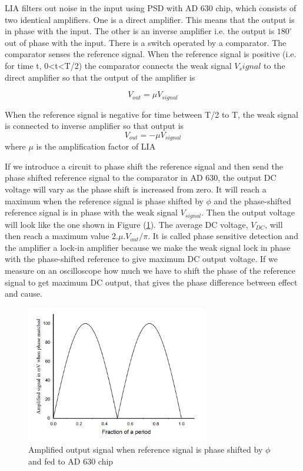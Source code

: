 \documentclass[a4paper, amsfonts, amssymb, amsmath, reprint, showkeys, nofootinbib, twoside]{revtex4-1}
\begin{document}
LIA filters out noise in the input using PSD with AD 630 chip, which consists of  two identical amplifiers. 
One is a direct amplifier. This means that the
output is in phase with the input. The other is an inverse amplifier i.e. the output is $180^{\circ}$
out of phase with the input. There is a switch operated by a comparator. The comparator senses the reference signal. When the reference signal is positive (i.e. for time t, 0<t<T/2) the comparator connects the weak signal $V_signal$ to the direct amplifier so that the output of the amplifier is 

\begin{equation}
	V_{out}=\mu V_{signal}
\end{equation}

When the reference signal is negative for time between T/2 to T, the weak signal is connected to inverse amplifier so that output is 
\begin{equation}
	V_{out}=-\mu V_{signal}
\end{equation}
where $\mu$ is the amplification factor of LIA

If we introduce a circuit to phase shift the reference signal and then send the phase shifted
reference signal to the comparator in AD 630, the output DC voltage will vary as the phase shift is increased from zero. It will reach a maximum when the reference signal is phase shifted by $\phi$ and the phase-shifted reference signal is in phase with the weak signal
$V_{signal}$. Then the output voltage will look like the one shown in Figure (\ref{f1}). The
average DC voltage, $V_{DC}$, will then reach a maximum value $2.\mu.V_{out}/\pi$.
It is called phase sensitive detection and the amplifier a lock-in amplifier because we make the weak signal lock in phase with the phase-shifted reference to give
maximum DC output voltage. If we measure on an oscilloscope how much we have to shift the phase of the reference signal to get maximum DC output, that gives the phase difference between effect and cause.

\begin{figure}[h]
		\centering
		\includegraphics[width=8cm]{f1} 
		\caption{Amplified output signal when reference signal is phase shifted by $\phi$ and fed to AD 630 chip }
		\label{f1}
\end{figure}
\end{document}
